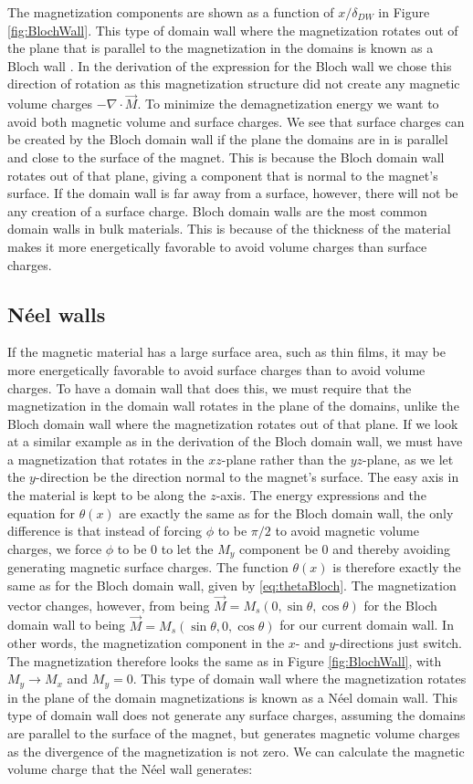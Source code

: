 \documentclass[1p]{elsarticle}		%
\numberwithin{equation}{section}
\begin{document}
The magnetization components are shown as a function of $x/\delta_{DW}$ in Figure \ref{fig:BlochWall}. This type of domain wall where the magnetization rotates out of the plane that is parallel to the magnetization in the domains is known as a Bloch wall \cite{Bloch1932}. In the derivation of the expression for the Bloch wall we chose this direction of rotation as this magnetization structure did not create any magnetic volume charges $-\nabla\cdot\vec{M}$. To minimize the demagnetization energy we want to avoid both magnetic volume and surface charges. We see that surface charges can be created by the Bloch domain wall if the plane the domains are in is parallel and close to the surface of the magnet. This is because the Bloch domain wall rotates out of that plane, giving a component that is normal to the magnet's surface. If the domain wall is far away from a surface, however, there will not be any creation of a surface charge. Bloch domain walls are the most common domain walls in bulk materials. This is because of the thickness of the material makes it more energetically favorable to avoid volume charges than surface charges.

\subsection{N\'{e}el walls}
If the magnetic material has a large surface area, such as thin films, it may be more energetically favorable to avoid surface charges than to avoid volume charges. To have a domain wall that does this, we must require that the magnetization in the domain wall rotates in the plane of the domains, unlike the Bloch domain wall where the magnetization rotates out of that plane. If we look at a similar example as in the derivation of the Bloch domain wall, we must have a magnetization that rotates in the $xz$-plane rather than the $yz$-plane, as we let the $y$-direction be the direction normal to the magnet's surface. The easy axis in the material is kept to be along the $z$-axis. The energy expressions and the equation for $\theta (x)$ are exactly the same as for the Bloch domain wall, the only difference is that instead of forcing $\phi$ to be $\pi/2$ to avoid magnetic volume charges, we force $\phi$ to be 0 to let the $M_y$ component be 0 and thereby avoiding generating magnetic surface charges. The function $\theta(x)$ is therefore exactly the same as for the Bloch domain wall, given by \eqref{eq:thetaBloch}. The magnetization vector changes, however, from being $\vec{M} = M_s(0, \sin\theta, \cos\theta)$ for the Bloch domain wall to being $\vec{M} = M_s(\sin\theta, 0, \cos\theta)$ for our current domain wall. In other words, the magnetization component in the $x$- and $y$-directions just switch. The magnetization therefore looks the same as in Figure \ref{fig:BlochWall}, with $M_y \rightarrow M_x$ and $M_y=0$. This type of domain wall where the magnetization rotates in the plane of the domain magnetizations is known as a N\'{e}el domain wall. This type of domain wall does not generate any surface charges, assuming the domains are parallel to the surface of the magnet, but generates magnetic volume charges as the divergence of the magnetization is not zero. We can calculate the magnetic volume charge that the N\'{e}el wall generates:
\end{document}
